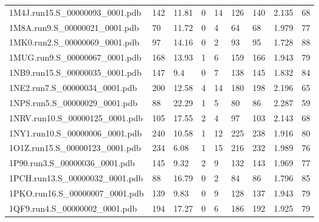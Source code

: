 \documentclass{bioinfo}
\begin{document}
\begin{table}[!t]
{\begin{tabular}{lllllllll}
    1M4J.run15.S\_00000093\_0001.pdb & 142      & 11.81      & 0           & 14          & 126         & 140     & 2.135           & 68           \\
    1M8A.run9.S\_00000021\_0001.pdb & 70       & 11.72      & 0           & 4           & 64          & 68      & 1.979           & 77           \\
    1MK0.run2.S\_00000069\_0001.pdb & 97       & 14.16      & 0           & 2           & 93          & 95      & 1.728           & 88           \\
    1MUG.run9.S\_00000067\_0001.pdb & 168      & 13.93      & 1           & 6           & 159         & 166     & 1.943           & 79           \\
    1NB9.run15.S\_00000035\_0001.pdb & 147      & 9.4        & 0           & 7           & 138         & 145     & 1.832           & 84           \\
    1NE2.run7.S\_00000034\_0001.pdb & 200      & 12.58      & 4           & 14          & 180         & 198     & 2.196           & 65           \\
    1NPS.run5.S\_00000029\_0001.pdb & 88       & 22.29      & 1           & 5           & 80          & 86      & 2.287           & 59           \\
    1NRV.run10.S\_00000125\_0001.pdb & 105      & 17.55      & 2           & 4           & 97          & 103     & 2.143           & 68           \\
    1NY1.run10.S\_00000006\_0001.pdb & 240      & 10.58      & 1           & 12          & 225         & 238     & 1.916           & 80           \\
    1O1Z.run15.S\_00000123\_0001.pdb & 234      & 6.08       & 1           & 15          & 216         & 232     & 1.989           & 76           \\
    1P90.run3.S\_00000036\_0001.pdb & 145      & 9.32       & 2           & 9           & 132         & 143     & 1.969           & 77           \\
    1PCH.run13.S\_00000032\_0001.pdb & 88       & 16.79      & 0           & 2           & 84          & 86      & 1.796           & 85           \\
    1PKO.run16.S\_00000007\_0001.pdb & 139      & 9.83       & 0           & 9           & 128         & 137     & 1.943           & 79           \\
    1QF9.run4.S\_00000002\_0001.pdb & 194      & 17.27      & 0           & 6           & 186         & 192     & 1.925           & 79           \\

\end{tabular}}
\end{table}
\end{document}
